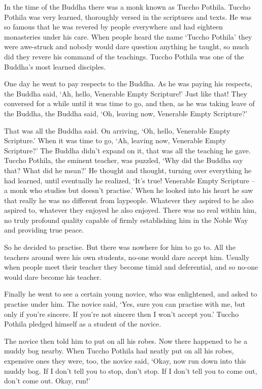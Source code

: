 In the time of the Buddha there was a monk known as Tuccho Pothila. Tuccho Pothila was very learned, thoroughly versed in the scriptures and texts. He was so famous that he was revered by people everywhere and had eighteen monasteries under his care. When people heard the name `Tuccho Pothila' they were awe-struck and nobody would dare question anything he taught, so much did they revere his command of the teachings. Tuccho Pothila was one of the Buddha's most learned disciples. 

One day he went to pay respects to the Buddha. As he was paying his respects, the Buddha said, `Ah, hello, Venerable Empty Scripture!' Just like that! They conversed for a while until it was time to go, and then, as he was taking leave of the Buddha, the Buddha said, `Oh, leaving now, Venerable Empty Scripture?' 

That was all the Buddha said. On arriving, `Oh, hello, Venerable Empty Scripture.' When it was time to go, `Ah, leaving now, Venerable Empty Scripture?' The Buddha didn't expand on it, that was all the teaching he gave. Tuccho Pothila, the eminent teacher, was puzzled, `Why did the Buddha say that? What did he mean?' He thought and thought, turning over everything he had learned, until eventually he realized, `It's true! Venerable Empty Scripture -- a monk who studies but doesn't practise.' When he looked into his heart he saw that really he was no different from laypeople. Whatever they aspired to he also aspired to, whatever they enjoyed he also enjoyed. There was no real  within him, no truly profound quality capable of firmly establishing him in the Noble Way and providing true peace. 

So he decided to practise. But there was nowhere for him to go to. All the teachers around were his own students, no-one would dare accept him. Usually when people meet their teacher they become timid and deferential, and so no-one would dare become his teacher. 

Finally he went to see a certain young novice, who was enlightened, and asked to practise under him. The novice said, `Yes, sure you can practise with me, but only if you're sincere. If you're not sincere then I won't accept you.' Tuccho Pothila pledged himself as a student of the novice. 

The novice then told him to put on all his robes. Now there happened to be a muddy bog nearby. When Tuccho Pothila had neatly put on all his robes, expensive ones they were, too, the novice said, `Okay, now run down into this muddy bog. If I don't tell you to stop, don't stop. If I don't tell you to come out, don't come out. Okay, run!' 

